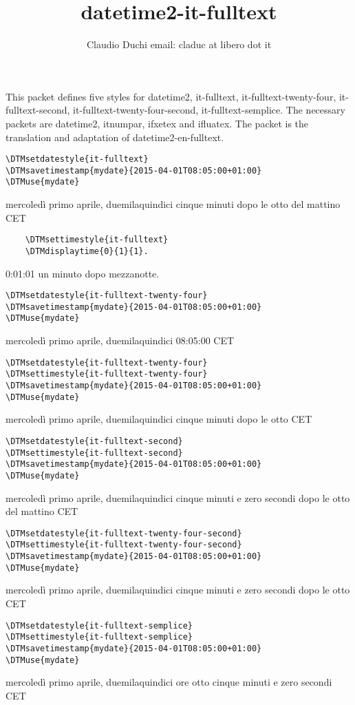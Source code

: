 \documentclass{ltxdoc}
\begin{document}
\title{datetime2-it-fulltext}
\author{Claudio Duchi email: claduc at libero dot it}
\maketitle
This packet defines five styles for datetime2, it-fulltext, it-fulltext-twenty-four, it-fulltext-second, it-fulltext-twenty-four-second, it-fulltext-semplice. The necessary packets are datetime2, itnumpar, ifxetex and ifluatex. The packet is the translation and adaptation of datetime2-en-fulltext.


\begin{verbatim}
\DTMsetdatestyle{it-fulltext}
\DTMsavetimestamp{mydate}{2015-04-01T08:05:00+01:00}
\DTMuse{mydate}
\end{verbatim}
mercoledì primo aprile, duemilaquindici cinque minuti dopo le otto del mattino CET

\begin{verbatim}
	\DTMsettimestyle{it-fulltext}
	\DTMdisplaytime{0}{1}{1}.
	\end{verbatim}
0:01:01 un minuto dopo mezzanotte.
\begin{verbatim}
\DTMsetdatestyle{it-fulltext-twenty-four}
\DTMsavetimestamp{mydate}{2015-04-01T08:05:00+01:00}
\DTMuse{mydate}
\end{verbatim}
mercoledì primo aprile, duemilaquindici 08:05:00 CET
\begin{verbatim}
\DTMsetdatestyle{it-fulltext-twenty-four}
\DTMsettimestyle{it-fulltext-twenty-four}
\DTMsavetimestamp{mydate}{2015-04-01T08:05:00+01:00}
\DTMuse{mydate}
\end{verbatim}
mercoledì primo aprile, duemilaquindici cinque minuti dopo le otto CET
\begin{verbatim}
\DTMsetdatestyle{it-fulltext-second}
\DTMsettimestyle{it-fulltext-second}
\DTMsavetimestamp{mydate}{2015-04-01T08:05:00+01:00}
\DTMuse{mydate}
\end{verbatim}
mercoledì primo aprile, duemilaquindici cinque minuti e zero secondi dopo le
otto del mattino CET
\begin{verbatim}
\DTMsetdatestyle{it-fulltext-twenty-four-second}
\DTMsettimestyle{it-fulltext-twenty-four-second}
\DTMsavetimestamp{mydate}{2015-04-01T08:05:00+01:00}
\DTMuse{mydate}
\end{verbatim}
mercoledì primo aprile, duemilaquindici cinque minuti e zero secondi dopo le
otto CET
\begin{verbatim}
\DTMsetdatestyle{it-fulltext-semplice}
\DTMsettimestyle{it-fulltext-semplice}
\DTMsavetimestamp{mydate}{2015-04-01T08:05:00+01:00}
\DTMuse{mydate}
\end{verbatim}
mercoledì primo aprile, duemilaquindici ore otto cinque minuti e zero secondi
CET
\end{document}
